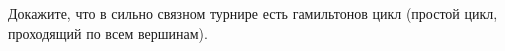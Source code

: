 Докажите, что в сильно связном турнире есть гамильтонов цикл (простой цикл, проходящий по всем вершинам).